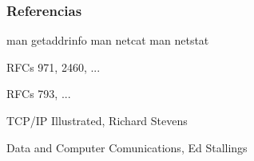 \begin{frame}[allowframebreaks]
   \frametitle<presentation>{Referencias}

   \begin{thebibliography}{10}

         \beamertemplatearticlebibitems

         man getaddrinfo
         man netcat
         man netstat

        RFCs 971, 2460, ...

        RFCs 793, ...

        TCP/IP Illustrated, Richard Stevens

        Data and Computer Comunications, Ed Stallings
   \end{thebibliography}
\end{frame}




